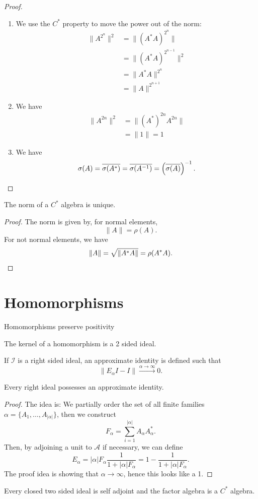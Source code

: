 \documentclass[twoside,symmetric, openany, 12pt]{./tuftebook}
\theoremstyle{definition}
\theoremstyle{definition}
\theoremstyle{definition}
\begin{document}
\begin{proof}
	\begin{enumerate}
		\item We use the $C^*$ property to move the power out of the norm:
			\begin{align*}
				\|A^{2^n}\|^2&= \|(A^* A)^{2^n}\|\\
					     &= \|(A^* A)^{2^{n - 1}}\|^2\\
					     &= \|A^* A\|^{2^{n}}\\
					     &= \|A\|^{2^{n+1}}
			\end{align*}
		\item We have
			\begin{align*}
				\|A^{2n}\|^2 &= \|(A^*)^{2n}A^{2n}\|\\
					     &= \|1\|=1
			\end{align*}
		\item We have
			\[
				\sigma(A) = \overline{\sigma(A^*)}=\overline{\sigma(A^{-1})}=\left( \overline{\sigma(A)} \right)^{-1}
			.\qedhere\] 
	\end{enumerate}
\end{proof}
\begin{Theorem}[Uniqueness]
	The norm of a $C^*$ algebra is unique.
\end{Theorem}
\begin{proof}
	The norm is given by, for normal elements,
	\[
	\|A\|=\rho(A)
	.\] 
	For not normal elements, we have
	\[
	\|A\|= \sqrt{\|A^* A\|}=\rho(A^*A)
	.\qedhere\] 
\end{proof}
\chapter{Homomorphisms}
\begin{Theorem}
	Homomorphisms preserve positivity
\end{Theorem}
\begin{Theorem}
	The kernel of a homomorphism is a 2 sided ideal.
\end{Theorem}
\begin{Definition}
	If $\mathcal{I}$ is a right sided ideal, an approximate identity is defined such that
	\[
		\|E_\alpha I - I\|\xrightarrow{\alpha \to\infty}0
	.\] 
\end{Definition}
\begin{Theorem}
	Every right ideal possesses an approximate identity.
\end{Theorem}
\begin{proof}
	The idea is: We partially order the set of all finite families $\alpha = \{A_1, \dots, A_{|\alpha|}\} $, then we construct
	\[
	F_\alpha = \sum_{i=1}^{|\alpha|} A_\alpha A_\alpha^*
	.\] 
	Then, by adjoining a unit to $\mathcal{A}$ if necessary, we can define
	\[
	E_\alpha = |\alpha| F_\alpha \frac{1}{1+|\alpha|F_\alpha}=1 - \frac{1}{1+|\alpha|F_\alpha}
	.\] 
	The proof idea is showing that $\alpha\to\infty$, hence this looks like a 1.
\end{proof}
\begin{Theorem}
	Every closed two sided ideal is self adjoint and the factor algebra is a $C^*$ algebra.
\end{Theorem}
\end{document}
